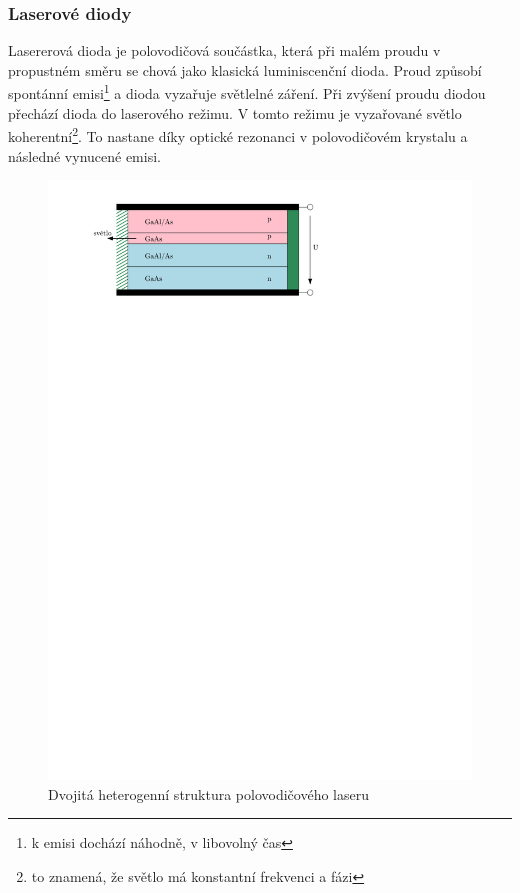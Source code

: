 \subsubsection{Laserové diody}
Lasererová dioda je polovodičová součástka, která při malém proudu v propustném směru se chová jako klasická luminiscenční dioda. Proud způsobí spontánní emisi\footnote{k emisi dochází náhodně, v libovolný čas} a dioda vyzařuje světlelné záření. Při zvýšení proudu diodou přechází dioda do laserového režimu. V tomto režimu je vyzařované světlo koherentní\footnote{to znamená, že světlo má konstantní frekvenci a fázi}. To nastane díky optické rezonanci v polovodičovém krystalu a následné vynucené emisi.

\begin{figure}[!h]
    \begin{center}
        \includegraphics[scale=1]{img/laser}
    \end{center}
    \caption{Dvojitá heterogenní struktura polovodičového laseru}
\end{figure}

